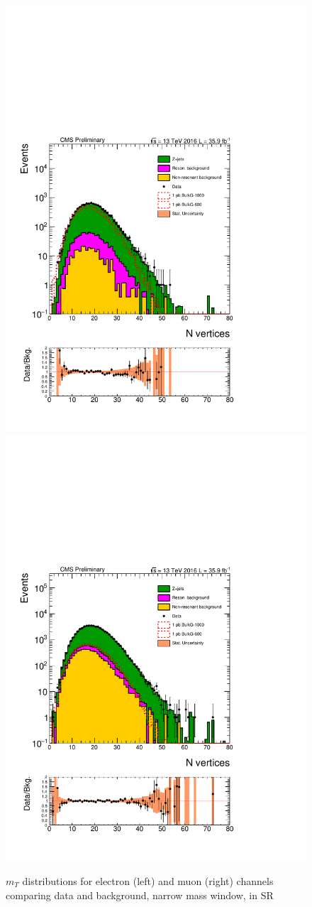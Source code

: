 \begin{figure}[htbp!]
\centering
\includegraphics[width=0.46\linewidth,page=5]{figures/ReMiniSummer16_DT_PhReMiniMCRcFixXsec_GMCPhPtWt_SRdPhiGT0p5_puWeightsummer16_muoneg_gjet_metfilter_unblind_el_log_1pb.pdf}
\includegraphics[width=0.46\linewidth,page=5]{figures/ReMiniSummer16_DT_PhReMiniMCRcFixXsec_GMCPhPtWt_SRdPhiGT0p5_puWeightsummer16_muoneg_gjet_metfilter_unblind_mu_log_1pb.pdf}
\caption{$m_T$ distributions for electron (left) and muon (right) channels
comparing data and background,
narrow mass window, in SR}
\label{fit:SR_gjet_mt_narrow}
\end{figure}

